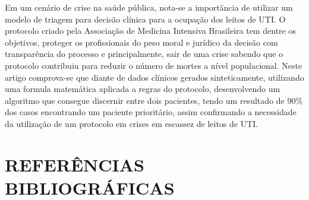 \documentclass[12pt]{article}
\begin{document}
Em um cenário de crise na saúde pública, nota-se a importância de utilizar um modelo de triagem para decisão clínica para a ocupação dos leitos de UTI. O protocolo criado pela Associação de Medicina Intensiva Brasileira tem dentre os objetivos, proteger os profissionais do peso moral e jurídico da decisão com transparência do processo e principalmente, sair de uma crise sabendo que o protocolo contribuiu para reduzir o número de mortes a nível populacional. Neste artigo comprova-se que diante de dados clínicos gerados sinteticamente, utilizando uma formula matemática aplicada a regras do protocolo, desenvolvendo um algoritmo que consegue discernir entre dois pacientes, tendo um resultado de 90\% dos casos encontrando um paciente prioritário, assim confirmando a necessidade da utilização de um protocolo em crises em escassez de leitos de UTI.

\section{REFERÊNCIAS BIBLIOGRÁFICAS}



\end{document}
